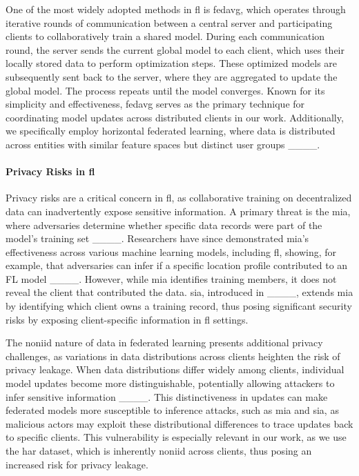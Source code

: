 One of the most widely adopted methods in \ac{fl} is \ac{fedavg}, which operates through iterative rounds of communication between a central server and participating clients to collaboratively train a shared model. During each communication round, the server sends the current global model to each client, which uses their locally stored data to perform optimization steps. These optimized models are subsequently sent back to the server, where they are aggregated to update the global model. The process repeats until the model converges. Known for its simplicity and effectiveness, \ac{fedavg} serves as the primary technique for coordinating model updates across distributed clients in our work. Additionally, we specifically employ horizontal federated learning, where data is distributed across entities with similar feature spaces but distinct user groups ____.

\paragraph{\textbf{Privacy Risks in \ac{fl}}}
Privacy risks are a critical concern in \ac{fl}, as collaborative training on decentralized data can inadvertently expose sensitive information. A primary threat is the \ac{mia}, where adversaries determine whether specific data records were part of the model's training set ____. Researchers have since demonstrated \ac{mia}'s effectiveness across various machine learning models, including \ac{fl}, showing, for example, that adversaries can infer if a specific location profile contributed to an FL model ____. However, while \ac{mia} identifies training members, it does not reveal the client that contributed the data. \ac{sia}, introduced in ____, extends \ac{mia} by identifying which client owns a training record, thus posing significant security risks by exposing client-specific information in \ac{fl} settings.

The \ac{noniid} nature of data in federated learning presents additional privacy challenges, as variations in data distributions across clients heighten the risk of privacy leakage. When data distributions differ widely among clients, individual model updates become more distinguishable, potentially allowing attackers to infer sensitive information ____. This distinctiveness in updates can make federated models more susceptible to inference attacks, such as \ac{mia} and \ac{sia}, as malicious actors may exploit these distributional differences to trace updates back to specific clients. This vulnerability is especially relevant in our work, as we use the \ac{har} dataset, which is inherently \ac{noniid} across clients, thus posing an increased risk for privacy leakage.




